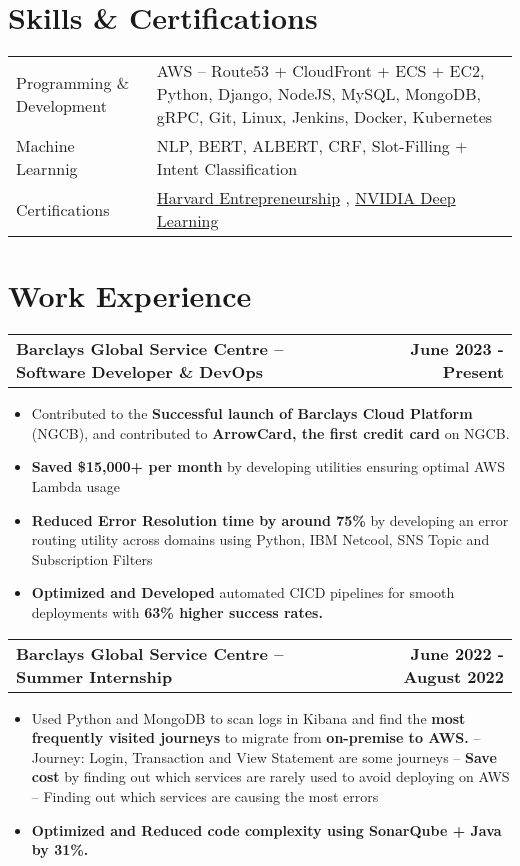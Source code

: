 \documentclass[letterpaper,12pt]{article}
\makeatletter
\newenvironment{joblong}[2]
    {
    \begin{tabularx}{\linewidth}{@{}l X r@{}}
    \textbf{#1} & \hfill &  #2 \\[3.75pt]
    \end{tabularx}
    \begin{minipage}[t]{\linewidth}
    \begin{itemize}[nosep,after=\strut, leftmargin=1em, itemsep=3pt,label=--]
    }
    {
    \end{itemize}
    \end{minipage}    
    }
\makeatother
\begin{document}
\section{Skills \& Certifications}
\begin{tabularx}{\linewidth}{@{}l X@{}}
Programming \& Development &  \normalsize{AWS -- Route53 + CloudFront + ECS + EC2, Python, Django, NodeJS, MySQL, MongoDB, gRPC, Git, Linux, Jenkins, Docker, Kubernetes}\\
Machine Learnnig &  \normalsize{NLP, BERT, ALBERT, CRF, Slot-Filling + Intent Classification}\\  
Certifications & \normalsize{\href{https://courses.edx.org/certificates/09ce93111ee34656b2351006a9a4ebad}{Harvard Entrepreneurship} , \href{https://learn.nvidia.com/certificates?id=0dfcf9b3a87143c59605f8179bd6ebb8}{NVIDIA Deep Learning}}
\end{tabularx}


\vspace{-5pt}
\section{Work Experience}
\vspace{-5pt}
\begin{joblong}{Barclays Global Service Centre -- Software Developer \& DevOps}{\textbf{June 2023 - Present}}
\item Contributed to the \textbf{Successful launch of Barclays Cloud Platform} (NGCB), and contributed to \textbf{ArrowCard, the first credit card} on NGCB.
\item \textbf{Saved \$15,000+ per month} by developing utilities ensuring optimal AWS Lambda usage
\item \textbf{Reduced Error Resolution time by around 75\%} by developing an error routing utility across domains using Python, IBM Netcool, SNS Topic and Subscription Filters
\item \textbf{Optimized and Developed} automated CICD pipelines for smooth deployments with \textbf{63\% higher success rates.}
\end{joblong}

\begin{joblong}{Barclays Global Service Centre -- Summer Internship}{\textbf{June 2022 - August 2022}}
\item Used Python and MongoDB to scan logs in Kibana and find the \textbf{most frequently visited journeys} to migrate from \textbf{on-premise to AWS.}
\subitem -- Journey: Login, Transaction and View Statement are some journeys
\subitem -- \textbf{Save cost} by finding out which services are rarely used to avoid deploying on AWS
\subitem -- Finding out which services are causing the most errors
\item \textbf{Optimized and Reduced code complexity using SonarQube + Java by 31\%.}
\end{joblong}
  
\end{document}
